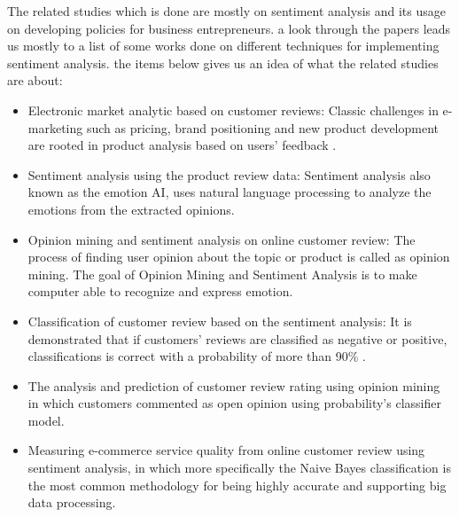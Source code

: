 The related studies which is done are mostly on sentiment analysis and its usage on developing policies for business entrepreneurs. a look through the papers leads us mostly to a list of some works done on different techniques for implementing sentiment analysis. the items below gives us an idea of what the related studies are about:
\begin{itemize}
    \item Electronic market analytic based on customer reviews: Classic challenges in e-marketing such as pricing, brand positioning and new product development are rooted in product analysis based on users’ feedback \cite{2008}.
    \item Sentiment analysis using the product review data: Sentiment analysis also known as the emotion AI, uses natural language processing to analyze the emotions from the extracted opinions\cite{sari_measuring_2018}.
    \item Opinion mining and sentiment analysis on online customer review: The process of finding user opinion about the topic or product is called as opinion mining. The goal of Opinion Mining and Sentiment Analysis is to make computer able to recognize and express emotion\cite{kumar_opinion_2016}.
    \item Classification of customer review based on the sentiment analysis: It is demonstrated that if customers' reviews are classified as negative or positive, classifications is correct with a probability of more than 90\% \cite{fang_sentiment_2015}.
    \item The analysis and prediction of customer review rating using opinion mining in which customers commented as open opinion using probability's classifier model\cite{songpan_analysis_2017-1}.
    \item Measuring e-commerce service quality from online customer review using sentiment analysis, in which more specifically the Naive Bayes classification is the most common methodology for being highly accurate and supporting big data processing.
\end{itemize}
